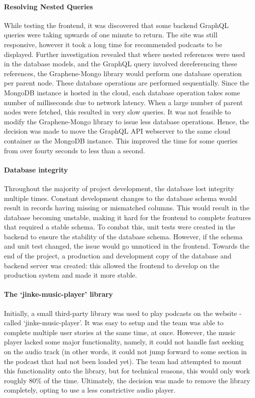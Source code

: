 \documentclass[../report.tex]{subfiles}
\begin{document}
\paragraph{Resolving Nested Queries}

While testing the frontend, it was discovered that some backend GraphQL queries were taking upwards of one minute to return.
The site was still responsive, however it took a long time for recommended podcasts to be displayed.
Further investigation revealed that where nested references were used in the database models, and the GraphQL query involved dereferencing these references, the Graphene-Mongo library would perform one database operation per parent node.
These database operations are performed sequentially.
Since the MongoDB instance is hosted in the cloud, each database operation takes some number of milliseconds due to network latency.
When a large number of parent nodes were fetched, this resulted in very slow queries.
It was not feasible to modify the Graphene-Mongo library to issue less database operations.
Hence, the decision was made to move the GraphQL API webserver to the same cloud container as the MongoDB instance.
This improved the time for some queries from over fourty seconds to less than a second.

\paragraph{Database integrity}

Throughout the majority of project development, the database lost integrity multiple times.
Constant development changes to the database schema would result in records having missing or mismatched columns.
This would result in the database becoming unstable, making it hard for the frontend to complete features that required a stable schema.
To combat this, unit tests were created in the backend to ensure the stability of the database schema.
However, if the schema and unit test changed, the issue would go unnoticed in the frontend.
Towards the end of the project, a production and development copy of the database and backend server was created: this allowed the frontend to develop on the production system and made it more stable.

\paragraph{The `jinke-music-player' library}

Initially, a small third-party library was used to play podcasts on the website - called `jinke-music-player'.
It was easy to setup and the team was able to complete multiple user stories at the same time, at once.
However, the music player lacked some major functionality, namely, it could not handle fast seeking on the audio track (in other words, it could not jump forward to some section in the podcast that had not been loaded yet).
The team had attempted to mount this functionality onto the library, but for technical reasons, this would only work roughly 80\% of the time.
Ultimately, the decision was made to remove the library completely, opting to use a less constrictive audio player.
\end{document}
